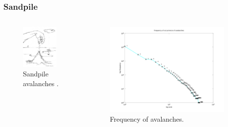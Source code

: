 \documentclass{beamer}
\begin{document}
\frame
{
  \frametitle{Sandpile}

  \begin{columns}[c]
     \begin{figure}[h!]
     \centering
     \includegraphics[width=0.9\textwidth]{images/sandpile.jpg}
     \caption{Sandpile avalanches \citep{bak1999}.}
     \label{fig:sandpile}
     \end{figure}  
     \begin{figure}[h!]
     \centering
     \includegraphics[width=0.95\textwidth]{images/sandpileavalancheszipf.png}
     \caption{Frequency of avalanches.}
     \label{fig:sandpileavalancheszipf}
     \end{figure} 
  \end{columns}
}
\end{document}
